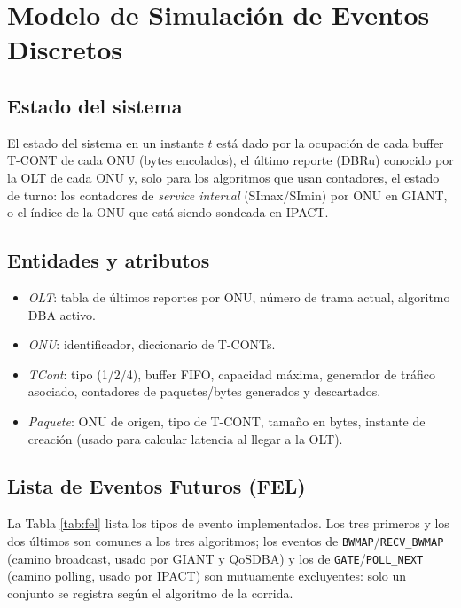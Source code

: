 \documentclass[conference]{IEEEtran}
\begin{document}
\section{Modelo de Simulación de Eventos Discretos}
\label{sec:des}

\subsection{Estado del sistema}

El estado del sistema en un instante $t$ está dado por la ocupación de
cada buffer T-CONT de cada ONU (bytes encolados), el último reporte
(DBRu) conocido por la OLT de cada ONU y, solo para los algoritmos que
usan contadores, el estado de turno: los contadores de \emph{service
interval} (SImax/SImin) por ONU en GIANT, o el índice de la ONU que está
siendo sondeada en IPACT.

\subsection{Entidades y atributos}

\begin{itemize}
\item \textit{OLT}: tabla de últimos reportes por ONU, número de trama
actual, algoritmo DBA activo.
\item \textit{ONU}: identificador, diccionario de T-CONTs.
\item \textit{TCont}: tipo (1/2/4), buffer FIFO, capacidad máxima,
generador de tráfico asociado, contadores de paquetes/bytes generados y
descartados.
\item \textit{Paquete}: ONU de origen, tipo de T-CONT, tamaño en bytes,
instante de creación (usado para calcular latencia al llegar a la OLT).
\end{itemize}

\subsection{Lista de Eventos Futuros (FEL)}

La Tabla \ref{tab:fel} lista los tipos de evento implementados. Los tres
primeros y los dos últimos son comunes a los tres algoritmos; los
eventos de \texttt{BWMAP}/\texttt{RECV\_BWMAP} (camino broadcast,
usado por GIANT y QoSDBA) y los de \texttt{GATE}/\texttt{POLL\_NEXT}
(camino polling, usado por IPACT) son mutuamente excluyentes: solo un
conjunto se registra según el algoritmo de la corrida.
\end{document}
